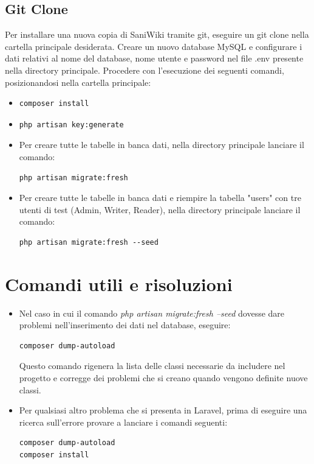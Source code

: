 \documentclass[twoside]{supsistudent}
\begin{document}
\subsection{Git Clone}
Per installare una nuova copia di SaniWiki tramite git, eseguire un git clone nella cartella principale desiderata. Creare un nuovo database MySQL e configurare i dati relativi al nome del database, nome utente e password nel file .env presente nella directory principale. Procedere con l'esecuzione dei seguenti comandi, posizionandosi nella cartella principale:
\begin{itemize}
\item \begin{verbatim}composer install\end{verbatim}
\item \begin{verbatim}php artisan key:generate\end{verbatim}
\item Per creare tutte le tabelle in banca dati, nella directory principale lanciare il comando:
\begin{verbatim}
php artisan migrate:fresh
\end{verbatim}
\item Per creare tutte le tabelle in banca dati e riempire la tabella "users" con tre utenti di test (Admin, Writer, Reader), nella directory principale lanciare il comando:
\begin{verbatim}
php artisan migrate:fresh --seed
\end{verbatim}
\end{itemize}

\section{Comandi utili e risoluzioni}
\begin{itemize}
\item Nel caso in cui il comando \textit{php artisan migrate:fresh --seed} dovesse dare problemi nell'inserimento dei dati nel database, eseguire:
\begin{verbatim}
composer dump-autoload
\end{verbatim}
Questo comando rigenera la lista delle classi necessarie da includere nel progetto e corregge dei problemi che si creano quando vengono definite nuove classi.
\item Per qualsiasi altro problema che si presenta in Laravel, prima di eseguire una ricerca sull'errore provare a lanciare i comandi seguenti:
\begin{verbatim}
composer dump-autoload
composer install
\end{verbatim}
\end{itemize}
\end{document}
